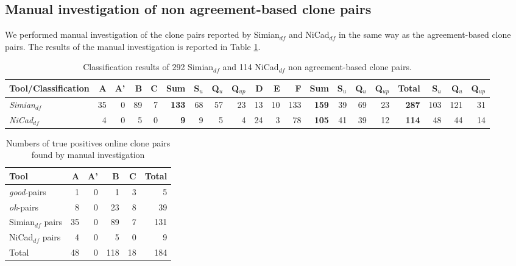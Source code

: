 \documentclass{sig-alternate-05-2015}
\begin{document}
\subsection{Manual investigation of non agreement-based clone pairs}
We performed manual investigation of the clone pairs reported by Simian$_{df}$ and NiCad$_{df}$ in the same way as the agreement-based clone pairs. The results of the manual investigation is reported in Table \ref{tab:classification_indv}.

\begin{table}
	\centering
	\caption{Classification results of 292 Simian$_{df}$ and 114 NiCad$_{df}$ non agreement-based clone pairs.}
	\label{tab:classification_indv}
	\small
	\begin{tabular}{|l|r|r|r|r|r|r|r|r|r|r|r|r|r|r|r|r|r|r|r|}
		\hline 
		Tool/Classification & A & A' & B & C & \textbf{Sum} & S$_{u}$ & Q$_{u}$ & Q$_{up}$ & D & E & F & \textbf{Sum}  & S$_{u}$ & Q$_{u}$ & Q$_{up}$ & \textbf{Total} & S$_{u}$ & Q$_{u}$  & Q$_{up}$  \\ 
		\hline 
		\multirow{1}{*}{\textit{Simian$_{df}$}} & 35 & 0 & 89 & 7 & \textbf{133} & 68 & 57 & 23 & 13 & 10 & 133 & \textbf{159} & 39 & 69 & 23 & \textbf{287} & 103 & 121 & 31 \\
		\hline
		\multirow{1}{*}{\textit{NiCad$_{df}$}} & 4  & 0 & 5 & 0 & \textbf{9} & 9 & 5 & 4 & 24 & 3 & 78 & \textbf{105} & 41 & 39 & 12 & \textbf{114} & 48 & 44 & 14 \\ 
		\hline
	\end{tabular} 
\end{table}

\begin{table}[H]
	\centering
	\caption{Numbers of true positives online clone pairs found by manual investigation}
	\label{tab:classification_true_pairs_summary}
	\small
	\begin{tabular}{l|r|r|r|r|r}
		\hline 
		Tool & A & A' & B & C & Total \\
		\hline
		\textit{good}-pairs & 1 & 0 & 1 & 3 & 5 \\
		\textit{ok}-pairs & 8 & 0 & 23 & 8 & 39 \\
		Simian$_{df}$ pairs & 35 & 0 & 89 & 7 & 131 \\
		NiCad$_{df}$ pairs & 4 & 0 & 5 & 0 & 9 \\
		\hline 
		Total & 48 & 0 & 118 & 18 & 184 \\
		\hline
	\end{tabular} 
\end{table}
\end{document}
